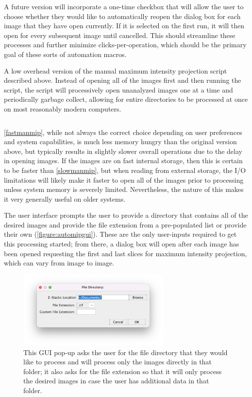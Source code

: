 A future version will incorporate a one\hyp{}time checkbox that will allow the user to choose whether they would like to automatically reopen the dialog box for each image that they have open currently. If it is selected on the first run, it will then open for every subsequent image until cancelled. This should streamline these processes and further minimize clicks\hyp{}per\hyp{}operation, which should be the primary goal of these sorts of automation macros.

\begin{code}
\caption{A low overhead version of the manual maximum intensity projection script described above. Instead of opening all of the images first and then running the script, the script will processively open unanalyzed images one at a time and periodically garbage collect, allowing for entire directories to be processed at once on most reasonably modern computers.}
\label{fastmanmip}

\inputminted[breaklines,frame=single,fontsize=\small]{python}{source/fast_manMIPper.py}

\end{code}

\autoref{fastmanmip}, while not always the correct choice depending on user preferences and system capabilities, is much less memory hungry than the original version above, but typically results in slightly slower overall operations due to the delay in opening images. If the images are on fast internal storage, then this is certain to be faster than \autoref{slowmanmip}, but when reading from external storage, the I/O limitations will likely make it faster to open all of the images prior to processing unless system memory is severely limited. Nevertheless, the nature of this makes it very generally useful on older systems.

The user interface prompts the user to provide a directory that contains all of the desired images and provide the file extension from a pre\hyp{}populated list or provide their own (\autoref{figure:automipgui}). These are the only user\hyp{}inputs required to get this processing started; from there, a dialog box will open after each image has been opened requesting the first and last slices for maximum intensity projection, which can vary from image to image.

\begin{figure}
\centering
\includegraphics[width=3in]{images/automipgui.png}
\caption{This GUI pop\hyp{}up asks the user for the file directory that they would like to process and will process only the images directly in that folder; it also asks for the file extension so that it will only process the desired images in case the user has additional data in that folder.}
\label{figure:automipgui}
\end{figure}

